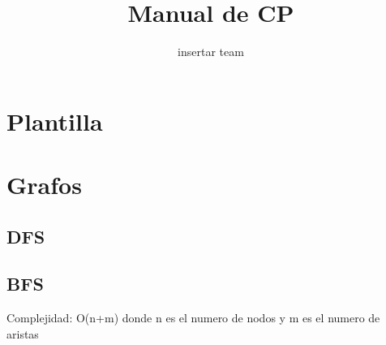 \documentclass[10pt,a4paper,twocolumn]{article}
\begin{document}
	\title{Manual de CP}
	\author{insertar team}
	\date{}
	\maketitle
	
	\tableofcontents
	
	
	\section{Plantilla}
		
		\dotfill
	\section{Grafos}
		\dotfill
		\subsection{DFS}
		
		\dotfill
		
		\subsection{BFS}
Complejidad: O(n+m) donde n es el numero de nodos y m es el numero de aristas
		
		\dotfill
\end{document}
